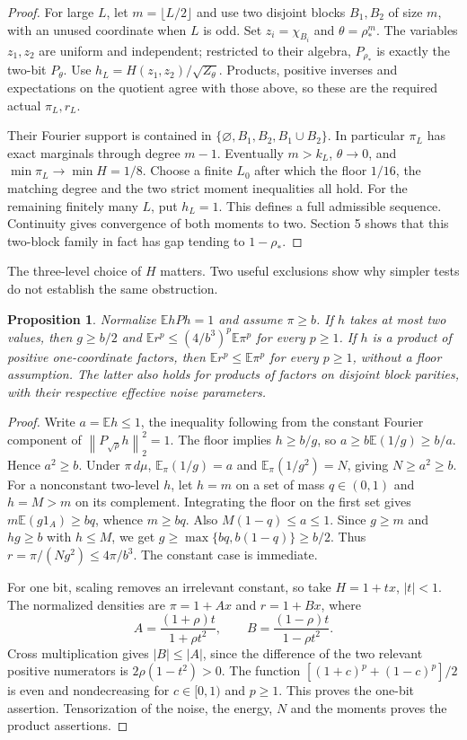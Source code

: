 \documentclass[11pt]{article}
\newcommand{\E}{\mathbb E}
\newcommand{\norm}[1]{\left\|#1\right\|}
\newtheorem{proposition}[theorem]{Proposition}
\begin{document}
\begin{proof}
For large $L$, let $m=\lfloor L/2\rfloor$ and use two disjoint blocks $B_1,B_2$ of size $m$, with an unused coordinate when $L$ is odd. Set $z_i=\chi_{B_i}$ and $\theta=\rho_*^m$. The variables $z_1,z_2$ are uniform and independent; restricted to their algebra, $P_{\rho_*}$ is exactly the two-bit $P_\theta$. Use $h_L=H(z_1,z_2)/\sqrt{Z_\theta}$. Products, positive inverses and expectations on the quotient agree with those above, so these are the required actual $\pi_L,r_L$.

Their Fourier support is contained in
$\{\varnothing,B_1,B_2,B_1\cup B_2\}$. In particular $\pi_L$ has exact marginals through degree $m-1$. Eventually $m>k_L$, $\theta\to0$, and $\min\pi_L\to\min H=1/8$. Choose a finite $L_0$ after which the floor $1/16$, the matching degree and the two strict moment inequalities all hold. For the remaining finitely many $L$, put $h_L=1$. This defines a full admissible sequence. Continuity gives convergence of both moments to two. Section 5 shows that this two-block family in fact has gap tending to $1-\rho_*$.
\end{proof}

The three-level choice of $H$ matters. Two useful exclusions show why simpler tests do not establish the same obstruction.
\begin{proposition}\label{simplefamilies}
Normalize $\E hPh=1$ and assume $\pi\geq b$. If $h$ takes at most two values, then $g\geq b/2$ and
$\E r^p\leq(4/b^3)^p\E\pi^p$ for every $p\geq1$.
If $h$ is a product of positive one-coordinate factors, then $\E r^p\leq\E\pi^p$ for every $p\geq1$, without a floor assumption. The latter also holds for products of factors on disjoint block parities, with their respective effective noise parameters.
\end{proposition}
\begin{proof}
Write $a=\E h\leq1$, the inequality following from the constant Fourier component of $\norm{P_{\sqrt\rho}h}_2^2=1$. The floor implies $h\geq b/g$, so $a\geq b\E(1/g)\geq b/a$. Hence $a^2\geq b$. Under $\pi\,d\mu$,
$\E_\pi(1/g)=a$ and $\E_\pi(1/g^2)=N$, giving $N\geq a^2\geq b$.
For a nonconstant two-level $h$, let $h=m$ on a set of mass $q\in(0,1)$ and $h=M>m$ on its complement. Integrating the floor on the first set gives $m\E(g1_A)\geq bq$, whence $m\geq bq$. Also $M(1-q)\leq a\leq1$. Since $g\geq m$ and $hg\geq b$ with $h\leq M$, we get $g\geq\max\{bq,b(1-q)\}\geq b/2$. Thus $r=\pi/(Ng^2)\leq4\pi/b^3$. The constant case is immediate.

For one bit, scaling removes an irrelevant constant, so take $H=1+tx$, $|t|<1$. The normalized densities are $\pi=1+Ax$ and $r=1+Bx$, where
\[
 A=\frac{(1+\rho)t}{1+\rho t^2},\qquad
 B=\frac{(1-\rho)t}{1-\rho t^2}.
\]
Cross multiplication gives $|B|\leq|A|$, since the difference of the two relevant positive numerators is $2\rho(1-t^2)>0$. The function
$[(1+c)^p+(1-c)^p]/2$ is even and nondecreasing for $c\in[0,1)$ and $p\geq1$. This proves the one-bit assertion. Tensorization of the noise, the energy, $N$ and the moments proves the product assertions.
\end{proof}
\end{document}

